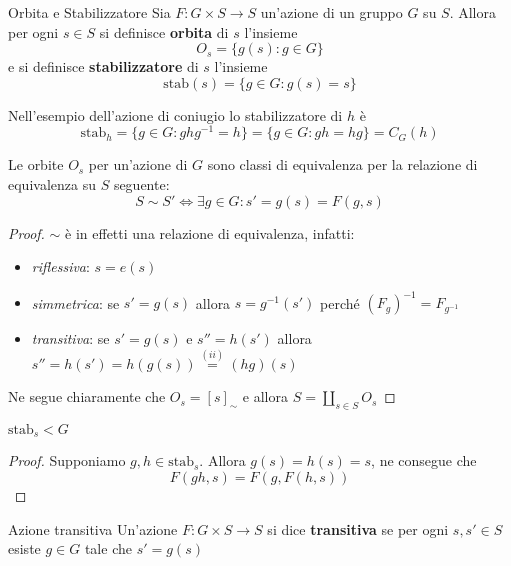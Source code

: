 \begin{definition}{Orbita e Stabilizzatore}
    Sia \(F : G \times  S \to S\) un'azione di un gruppo \(G\) su \(S\). Allora
    per ogni \(s \in S\) si definisce \textbf{orbita} di \(s\) l'insieme
    \[
        O_s = \{g{(s)} : g \in G\}
    \]
    e si definisce \textbf{stabilizzatore} di \(s\) l'insieme
    \[
        \text{stab}{(s)} = \{g \in G : g{(s)} = s\}
    \]
\end{definition}
\begin{example}
    Nell'esempio dell'azione di coniugio lo stabilizzatore di \(h\) è
    \[
        \text{stab}_h = \{g \in G : ghg^{-1} = h\} = \{g \in G : gh = hg\} =
        C_G{(h)}
    \]
\end{example}

\begin{proposition}

Le orbite \(O_s\) per un'azione di \(G\) sono classi di equivalenza per la
relazione di equivalenza su \(S\) seguente:
\[
  S \sim S' \iff \exists g \in G : s' = g{(s)} = F{(g, s)}
\]
\end{proposition}
\begin{proof}
\(\sim\) è in effetti una relazione di equivalenza, infatti:
\begin{itemize}[label = --]
    \item \emph{riflessiva}: \(s = e{(s)}\)
    \item \emph{simmetrica}: se \(s' = g{(s)}\) allora \(s = g^{-1}{(s')}\)
        perché \({(F_g)}^{-1} = F_{g^{-1}} \) 
    \item \emph{transitiva}: se \(s' = g{(s)}\) e \(s'' = h{(s')}\) allora
        \(s'' = h{(s')} = h{(g{(s)})} \overset{(ii)}{=} {(hg)}{(s)}\)
\end{itemize}

Ne segue chiaramente che \(O_s = {[s]}_\sim \) e allora \(\displaystyle S = \coprod_{s \in S}
O_s\) 
\end{proof}
\begin{proposition}
    \(\text{stab}_s < G\) 
\end{proposition}
\begin{proof}
    Supponiamo \(g, h \in \text{stab}_s\). Allora \(g{(s)} = h{(s)} = s\), ne
    consegue che
    \[
      F{(gh, s)} = F{(g, F{(h, s)})} 
    \]
\end{proof}

\begin{definition}{Azione transitiva}
    Un'azione \(F : G \times S \to S \) si dice \textbf{transitiva} se per ogni
    \(s, s' \in S\) esiste \(g \in G\) tale che \(s' = g{(s)}\)
\end{definition}

